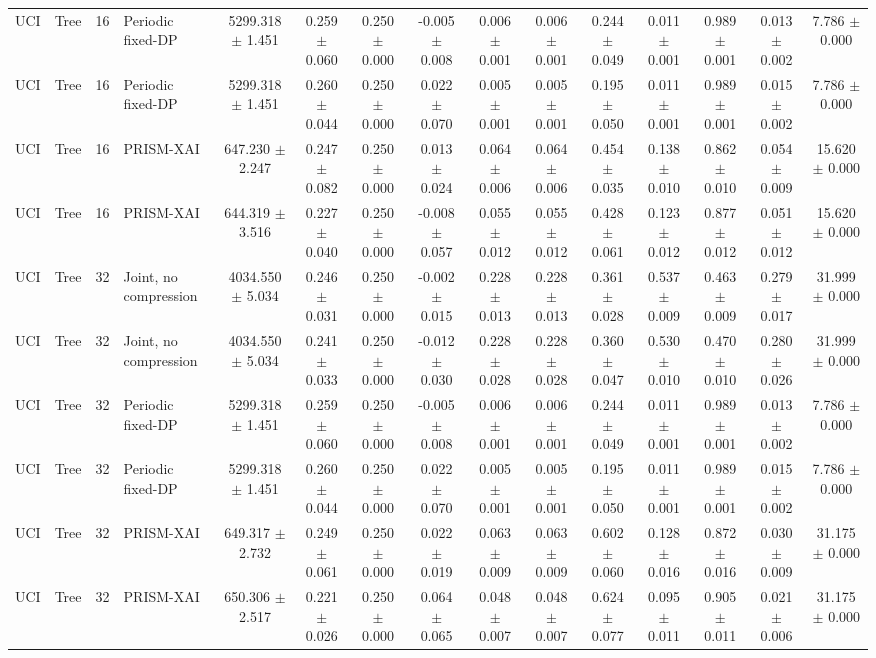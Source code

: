 \begin{tabular}{llllccccccccccc}
UCI & Tree & 16 & Periodic fixed-DP & 5299.318 $\pm$ 1.451 & 0.259 $\pm$ 0.060 & 0.250 $\pm$ 0.000 & -0.005 $\pm$ 0.008 & 0.006 $\pm$ 0.001 & 0.006 $\pm$ 0.001 & 0.244 $\pm$ 0.049 & 0.011 $\pm$ 0.001 & 0.989 $\pm$ 0.001 & 0.013 $\pm$ 0.002 & 7.786 $\pm$ 0.000 \\
UCI & Tree & 16 & Periodic fixed-DP & 5299.318 $\pm$ 1.451 & 0.260 $\pm$ 0.044 & 0.250 $\pm$ 0.000 & 0.022 $\pm$ 0.070 & 0.005 $\pm$ 0.001 & 0.005 $\pm$ 0.001 & 0.195 $\pm$ 0.050 & 0.011 $\pm$ 0.001 & 0.989 $\pm$ 0.001 & 0.015 $\pm$ 0.002 & 7.786 $\pm$ 0.000 \\
UCI & Tree & 16 & PRISM-XAI & 647.230 $\pm$ 2.247 & 0.247 $\pm$ 0.082 & 0.250 $\pm$ 0.000 & 0.013 $\pm$ 0.024 & 0.064 $\pm$ 0.006 & 0.064 $\pm$ 0.006 & 0.454 $\pm$ 0.035 & 0.138 $\pm$ 0.010 & 0.862 $\pm$ 0.010 & 0.054 $\pm$ 0.009 & 15.620 $\pm$ 0.000 \\
UCI & Tree & 16 & PRISM-XAI & 644.319 $\pm$ 3.516 & 0.227 $\pm$ 0.040 & 0.250 $\pm$ 0.000 & -0.008 $\pm$ 0.057 & 0.055 $\pm$ 0.012 & 0.055 $\pm$ 0.012 & 0.428 $\pm$ 0.061 & 0.123 $\pm$ 0.012 & 0.877 $\pm$ 0.012 & 0.051 $\pm$ 0.012 & 15.620 $\pm$ 0.000 \\
UCI & Tree & 32 & Joint, no compression & 4034.550 $\pm$ 5.034 & 0.246 $\pm$ 0.031 & 0.250 $\pm$ 0.000 & -0.002 $\pm$ 0.015 & 0.228 $\pm$ 0.013 & 0.228 $\pm$ 0.013 & 0.361 $\pm$ 0.028 & 0.537 $\pm$ 0.009 & 0.463 $\pm$ 0.009 & 0.279 $\pm$ 0.017 & 31.999 $\pm$ 0.000 \\
UCI & Tree & 32 & Joint, no compression & 4034.550 $\pm$ 5.034 & 0.241 $\pm$ 0.033 & 0.250 $\pm$ 0.000 & -0.012 $\pm$ 0.030 & 0.228 $\pm$ 0.028 & 0.228 $\pm$ 0.028 & 0.360 $\pm$ 0.047 & 0.530 $\pm$ 0.010 & 0.470 $\pm$ 0.010 & 0.280 $\pm$ 0.026 & 31.999 $\pm$ 0.000 \\
UCI & Tree & 32 & Periodic fixed-DP & 5299.318 $\pm$ 1.451 & 0.259 $\pm$ 0.060 & 0.250 $\pm$ 0.000 & -0.005 $\pm$ 0.008 & 0.006 $\pm$ 0.001 & 0.006 $\pm$ 0.001 & 0.244 $\pm$ 0.049 & 0.011 $\pm$ 0.001 & 0.989 $\pm$ 0.001 & 0.013 $\pm$ 0.002 & 7.786 $\pm$ 0.000 \\
UCI & Tree & 32 & Periodic fixed-DP & 5299.318 $\pm$ 1.451 & 0.260 $\pm$ 0.044 & 0.250 $\pm$ 0.000 & 0.022 $\pm$ 0.070 & 0.005 $\pm$ 0.001 & 0.005 $\pm$ 0.001 & 0.195 $\pm$ 0.050 & 0.011 $\pm$ 0.001 & 0.989 $\pm$ 0.001 & 0.015 $\pm$ 0.002 & 7.786 $\pm$ 0.000 \\
UCI & Tree & 32 & PRISM-XAI & 649.317 $\pm$ 2.732 & 0.249 $\pm$ 0.061 & 0.250 $\pm$ 0.000 & 0.022 $\pm$ 0.019 & 0.063 $\pm$ 0.009 & 0.063 $\pm$ 0.009 & 0.602 $\pm$ 0.060 & 0.128 $\pm$ 0.016 & 0.872 $\pm$ 0.016 & 0.030 $\pm$ 0.009 & 31.175 $\pm$ 0.000 \\
UCI & Tree & 32 & PRISM-XAI & 650.306 $\pm$ 2.517 & 0.221 $\pm$ 0.026 & 0.250 $\pm$ 0.000 & 0.064 $\pm$ 0.065 & 0.048 $\pm$ 0.007 & 0.048 $\pm$ 0.007 & 0.624 $\pm$ 0.077 & 0.095 $\pm$ 0.011 & 0.905 $\pm$ 0.011 & 0.021 $\pm$ 0.006 & 31.175 $\pm$ 0.000 \\
\bottomrule
\end{tabular}
